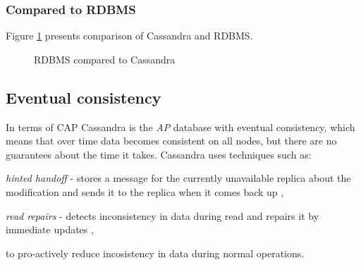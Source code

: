 \subsubsection{Compared to RDBMS}
Figure \ref{fig:cassandraToRdbms} presents comparison of Cassandra and RDBMS.
\begin{figure}[H]
  \setlength{\unitlength}{1.3cm}  
  \caption{RDBMS compared to Cassandra}
  \label{fig:cassandraToRdbms}
\end{figure}

\subsection{Eventual consistency}\label{sec:theory:eventualConsistency}
In terms of CAP \cite{brewer2000towards} \cite{Brewer:2012ba} Cassandra is the \emph{AP} database with eventual consistency, which means that over time data becomes consistent on all nodes, but there are no guarantees about the time it takes. Cassandra uses techniques such as: \begin{enumerate*} 
\item \emph{hinted handoff} - stores a message for the currently unavailable replica about the modification and sends it to the replica when it comes back up \cite{CassandraHintedHandoff},  
\item \emph{read repairs} - detects inconsistency in data during read and repairs it by immediate updates \cite{CassandraReadRepair},  \end{enumerate*} to pro-actively reduce incosistency in data during normal operations.